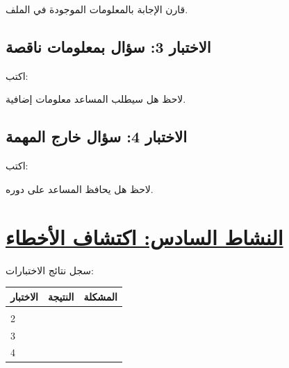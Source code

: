 \documentclass[a4paper]{article}
\begin{document}
قارن الإجابة بالمعلومات الموجودة في الملف.



\subsection*{\khatt الاختبار 3: سؤال بمعلومات ناقصة}

اكتب:

\begin{center}


\end{center}

لاحظ هل سيطلب المساعد معلومات إضافية.



\subsection*{\khatt الاختبار 4: سؤال خارج المهمة}

اكتب:

\begin{center}


\end{center}

لاحظ هل يحافظ المساعد على دوره.



\section*{\khatt\underline{النشاط السادس: اكتشاف الأخطاء}}

سجل نتائج الاختبارات:

\begin{center}

\begin{tabular}{|
>{\centering\arraybackslash}m{2cm}|
>{\raggedleft\arraybackslash}m{5cm}|
>{\raggedleft\arraybackslash}m{5cm}|}

\hline

\textbf{الاختبار}
&
\textbf{النتيجة}
&
\textbf{المشكلة}
\\

\hline

1
&
&
\\[1cm]

\hline

2
&
&
\\[1cm]

\hline

3
&
&
\\[1cm]

\hline

4
&
&
\\[1cm]

\hline

\end{tabular}

\end{center}
\end{document}
